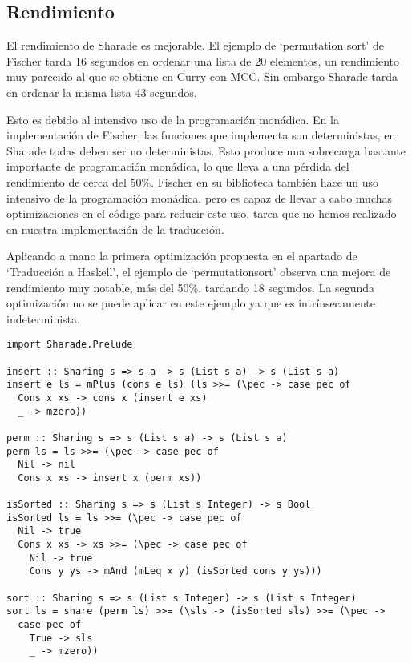 \documentclass[class=article, crop=false]{standalone}
\begin{document}
\subsection{Rendimiento}\label{sec:rendimiento}

El rendimiento de Sharade es mejorable. El ejemplo de `permutation sort' de
Fischer\cite{fischer2011purely} tarda 16 segundos en ordenar una lista de 20 elementos, un
rendimiento muy parecido al que se obtiene en Curry con MCC\cite{lux2003munster}. Sin embargo
Sharade tarda en ordenar la misma lista 43 segundos.

Esto es debido al intensivo uso de la programación monádica. En la implementación de Fischer,
las funciones que implementa son deterministas, en Sharade todas deben ser no deterministas.
Esto produce una sobrecarga bastante importante de programación monádica, lo que lleva a una
pérdida del rendimiento de cerca del 50\%. Fischer en su biblioteca también hace un uso
intensivo de la programación monádica, pero es capaz de llevar a cabo muchas optimizaciones
en el código para reducir este uso, tarea que no hemos realizado en nuestra implementación de
la traducción.

Aplicando a mano la primera optimización propuesta en el apartado de `Traducción a Haskell',
el ejemplo de `permutationsort' observa una mejora de rendimiento muy notable, más del 50\%,
tardando 18 segundos. La segunda optimización no se puede aplicar en este ejemplo ya que es
intrínsecamente indeterminista.

\begin{verbatim}
import Sharade.Prelude

insert :: Sharing s => s a -> s (List s a) -> s (List s a)
insert e ls = mPlus (cons e ls) (ls >>= (\pec -> case pec of
  Cons x xs -> cons x (insert e xs)
  _ -> mzero))

perm :: Sharing s => s (List s a) -> s (List s a)
perm ls = ls >>= (\pec -> case pec of
  Nil -> nil
  Cons x xs -> insert x (perm xs))

isSorted :: Sharing s => s (List s Integer) -> s Bool
isSorted ls = ls >>= (\pec -> case pec of
  Nil -> true
  Cons x xs -> xs >>= (\pec -> case pec of
    Nil -> true
    Cons y ys -> mAnd (mLeq x y) (isSorted cons y ys)))

sort :: Sharing s => s (List s Integer) -> s (List s Integer)
sort ls = share (perm ls) >>= (\sls -> (isSorted sls) >>= (\pec ->
  case pec of
    True -> sls
    _ -> mzero))
\end{verbatim}
\end{document}
